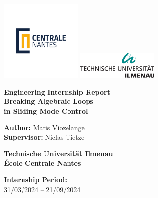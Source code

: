 \documentclass[a4paper, 12pt]{report}
\begin{document}
\renewcommand{\labelenumii}{\arabic{enumi}.\arabic{enumii}}

\begin{titlepage}
    \centering
    \vspace*{0cm}
    \includegraphics[width=0.3\textwidth]{imgs/LogoCN_Q.pdf}\hfill
    \includegraphics[width=0.3\textwidth]{imgs/TU_Ilmenau_Logo_black_green.svg.png}
    
    \vspace{3cm}
    
    \Huge\textbf{Engineering Internship Report}\\
    \vspace{1cm}
    \LARGE\textbf{Breaking Algebraic Loops}\\
    \LARGE\textbf{in Sliding Mode Control}
    
    \vfill
    
    \Large\textbf{Author:} Matis Viozelange\\[0.3cm]
    \Large\textbf{Supervisor:} Niclas Tietze\\
    
    \vfill
    
    \Large\textbf{Technische Universität Ilmenau}\\
    \vspace{0.5cm}
    \Large\textbf{École Centrale Nantes}
    
    \vspace{1.5cm}
    
    \Large\textbf{Internship Period:}\\
    \Large 31/03/2024 -- 21/09/2024

    \vspace*{1cm}
\end{titlepage}

\newpage
\thispagestyle{empty}
~
\end{document}
